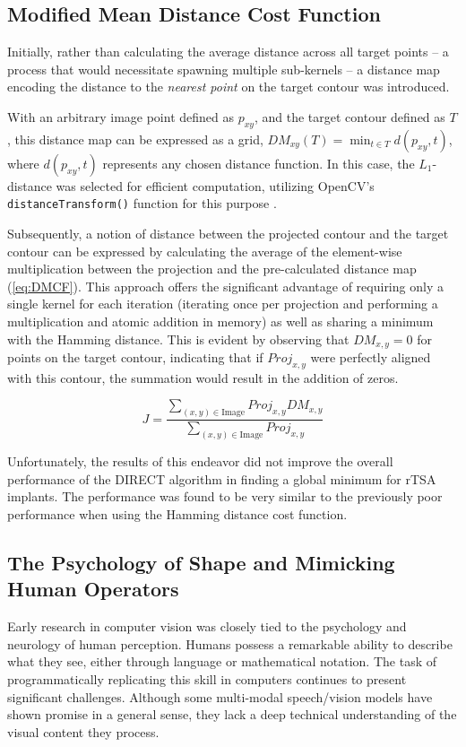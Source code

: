 \subsection{Modified Mean Distance Cost Function}
Initially, rather than calculating the average distance across all target points – a process that would necessitate spawning multiple sub-kernels – a distance map encoding the distance to the \emph{nearest point} on the target contour was introduced.


With an arbitrary image point defined as $p_{xy}$, and the target contour defined as $T$, this distance map can be expressed as a grid, $\displaystyle DM_{xy}(T) = \min_{t\in T}d(p_{xy},t)$, where $d(p_{xy},t)$ represents any chosen distance function.
In this case, the $L_{1}$-distance was selected for efficient computation, utilizing OpenCV's \texttt{distanceTransform()} function for this purpose \cite{bradskiOpenCVLibrary2000}.

Subsequently, a notion of distance between the projected contour and the target contour can be expressed by calculating the average of the element-wise multiplication between the projection and the pre-calculated distance map (\cref{eq:DMCF}).
This approach offers the significant advantage of requiring only a single kernel for each iteration (iterating once per projection and performing a multiplication and atomic addition in memory) as well as sharing a minimum with the Hamming distance.
This is evident by observing that $DM_{x,y}=0$ for points on the target contour, indicating that if $Proj_{x,y}$ were perfectly aligned with this contour, the summation would result in the addition of zeros.


\begin{equation}
  \label{eq:DMCF}
  J = \dfrac{ \sum_{(x,y) \in \text{Image}} Proj_{x,y}DM_{x,y} }{\sum_{(x,y)\in \text{Image}}Proj_{x,y}}
\end{equation}

Unfortunately, the results of this endeavor did not improve the overall performance of the DIRECT algorithm in finding a global minimum for rTSA implants.
The performance was found to be very similar to the previously poor performance when using the Hamming distance cost function.

\subsection{The Psychology of Shape and Mimicking Human Operators}
Early research in computer vision was closely tied to the psychology and neurology of human perception.
Humans possess a remarkable ability to describe what they see, either through language or mathematical notation.
The task of programmatically replicating this skill in computers continues to present significant challenges.
Although some multi-modal speech/vision models have shown promise in a general sense, they lack a deep technical understanding of the visual content they process.


